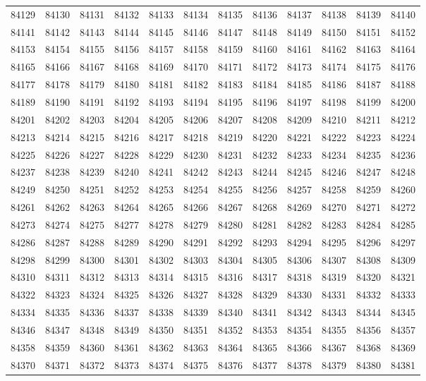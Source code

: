 \begin{center}
\begin{longtable}{llllllllllll}
84129 &84130 &84131 &84132 &84133 &84134 &84135 &84136 &84137 &84138 &84139 &84140 \\
84141 &84142 &84143 &84144 &84145 &84146 &84147 &84148 &84149 &84150 &84151 &84152 \\
84153 &84154 &84155 &84156 &84157 &84158 &84159 &84160 &84161 &84162 &84163 &84164 \\
84165 &84166 &84167 &84168 &84169 &84170 &84171 &84172 &84173 &84174 &84175 &84176 \\
84177 &84178 &84179 &84180 &84181 &84182 &84183 &84184 &84185 &84186 &84187 &84188 \\
84189 &84190 &84191 &84192 &84193 &84194 &84195 &84196 &84197 &84198 &84199 &84200 \\
84201 &84202 &84203 &84204 &84205 &84206 &84207 &84208 &84209 &84210 &84211 &84212 \\
84213 &84214 &84215 &84216 &84217 &84218 &84219 &84220 &84221 &84222 &84223 &84224 \\
84225 &84226 &84227 &84228 &84229 &84230 &84231 &84232 &84233 &84234 &84235 &84236 \\
84237 &84238 &84239 &84240 &84241 &84242 &84243 &84244 &84245 &84246 &84247 &84248 \\
84249 &84250 &84251 &84252 &84253 &84254 &84255 &84256 &84257 &84258 &84259 &84260 \\
84261 &84262 &84263 &84264 &84265 &84266 &84267 &84268 &84269 &84270 &84271 &84272 \\
84273 &84274 &84275 &84277 &84278 &84279 &84280 &84281 &84282 &84283 &84284 &84285 \\
84286 &84287 &84288 &84289 &84290 &84291 &84292 &84293 &84294 &84295 &84296 &84297 \\
84298 &84299 &84300 &84301 &84302 &84303 &84304 &84305 &84306 &84307 &84308 &84309 \\
84310 &84311 &84312 &84313 &84314 &84315 &84316 &84317 &84318 &84319 &84320 &84321 \\
84322 &84323 &84324 &84325 &84326 &84327 &84328 &84329 &84330 &84331 &84332 &84333 \\
84334 &84335 &84336 &84337 &84338 &84339 &84340 &84341 &84342 &84343 &84344 &84345 \\
84346 &84347 &84348 &84349 &84350 &84351 &84352 &84353 &84354 &84355 &84356 &84357 \\
84358 &84359 &84360 &84361 &84362 &84363 &84364 &84365 &84366 &84367 &84368 &84369 \\
84370 &84371 &84372 &84373 &84374 &84375 &84376 &84377 &84378 &84379 &84380 &84381 \\

\end{longtable}
\end{center}
